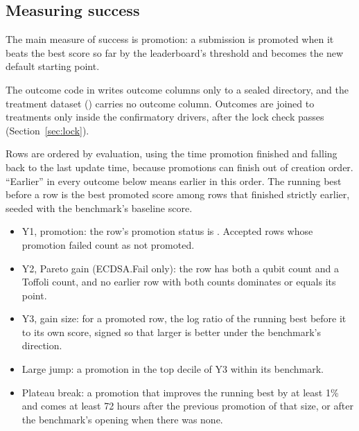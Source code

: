 \subsection{Measuring success}
\label{sec:outcomes}

The main measure of success is promotion: a submission is promoted when it beats the best score so far by the leaderboard's threshold and becomes the new default starting point.

The outcome code in  writes outcome columns only to a sealed directory, and the treatment dataset () carries no outcome column.
Outcomes are joined to treatments only inside the confirmatory drivers, after the lock check passes (Section~\ref{sec:lock}).

Rows are ordered by evaluation, using the time promotion finished and falling back to the last update time, because promotions can finish out of creation order.
``Earlier'' in every outcome below means earlier in this order.
The running best before a row is the best promoted score among rows that finished strictly earlier, seeded with the benchmark's baseline score.
\begin{itemize}
  \item Y1, promotion: the row's promotion status is . Accepted rows whose promotion failed count as not promoted.
  \item Y2, Pareto gain (ECDSA.Fail only): the row has both a qubit count and a Toffoli count, and no earlier row with both counts dominates or equals its point.
  \item Y3, gain size: for a promoted row, the log ratio of the running best before it to its own score, signed so that larger is better under the benchmark's direction.
  \item Large jump: a promotion in the top decile of Y3 within its benchmark.
  \item Plateau break: a promotion that improves the running best by at least 1\% and comes at least 72 hours after the previous promotion of that size, or after the benchmark's opening when there was none.
\end{itemize}

